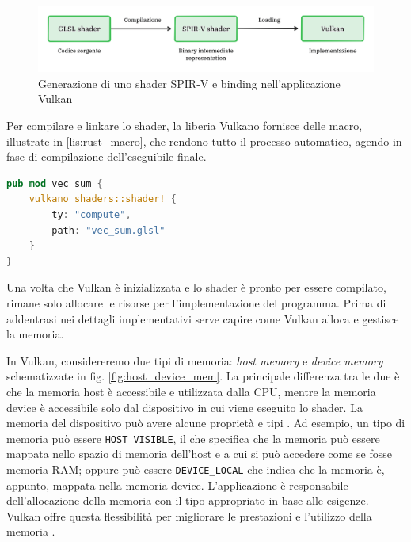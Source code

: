 \begin{figure}[ht]
    \centering
    \includegraphics[width=.9\linewidth]{images/chapter2/shader.png}
    \caption{Generazione di uno shader SPIR-V e binding nell'applicazione Vulkan}
    \label{fig:shader}
\end{figure}

Per compilare e linkare lo shader, la liberia Vulkano fornisce delle macro, illustrate in \ref{lis:rust_macro}, che rendono tutto il processo automatico, agendo in fase di compilazione dell'eseguibile finale.

\newpage

\vspace{5mm}
\begin{lstlisting}[language=Rust, caption=Compilazione e binding dello shader GLSL, label=lis:rust_macro]
pub mod vec_sum {
    vulkano_shaders::shader! {
        ty: "compute",
        path: "vec_sum.glsl"
    }
}
\end{lstlisting}
\vspace{5mm}

Una volta che Vulkan è inizializzata e lo shader è pronto per essere compilato, rimane solo allocare le risorse per l'implementazione del programma. Prima di addentrasi nei dettagli implementativi serve capire come Vulkan alloca e gestisce la memoria.


In Vulkan, considereremo due tipi di memoria: \textit{host memory} e \textit{device memory} schematizzate in fig. \ref{fig:host_device_mem}. La principale differenza tra le due è che la memoria host è accessibile e utilizzata dalla CPU, mentre la memoria device è accessibile solo dal dispositivo in cui viene eseguito lo shader. La memoria del dispositivo può avere alcune proprietà e tipi \cite[]{KG:VulkanGuide}. Ad esempio, un tipo di memoria può essere \verb|HOST_VISIBLE|, il che specifica che la memoria può essere mappata nello spazio di memoria dell'host e a cui si può accedere come se fosse memoria RAM; oppure può essere \verb|DEVICE_LOCAL| che indica che la memoria è, appunto, mappata nella memoria device. L'applicazione è responsabile dell'allocazione della memoria con il tipo appropriato in base alle esigenze. Vulkan offre questa flessibilità per migliorare le prestazioni e l'utilizzo della memoria \cite[]{KG:MemoryFlag}.

